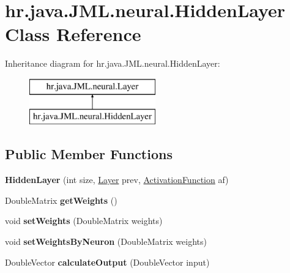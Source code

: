 \hypertarget{classhr_1_1java_1_1_j_m_l_1_1neural_1_1_hidden_layer}{\section{hr.\+java.\+J\+M\+L.\+neural.\+Hidden\+Layer Class Reference}
\label{classhr_1_1java_1_1_j_m_l_1_1neural_1_1_hidden_layer}
}
Inheritance diagram for hr.\+java.\+J\+M\+L.\+neural.\+Hidden\+Layer\+:\begin{figure}[H]
\begin{center}
\leavevmode
\includegraphics[height=2.000000cm]{classhr_1_1java_1_1_j_m_l_1_1neural_1_1_hidden_layer}
\end{center}
\end{figure}
\subsection*{Public Member Functions}
\begin{DoxyCompactItemize}
\item 
\hypertarget{classhr_1_1java_1_1_j_m_l_1_1neural_1_1_hidden_layer_a06bec6318a3df6d8875456a929b6c7be}{{\bfseries Hidden\+Layer} (int size, \hyperlink{classhr_1_1java_1_1_j_m_l_1_1neural_1_1_layer}{Layer} prev, \hyperlink{classhr_1_1java_1_1_j_m_l_1_1activation_functions_1_1_activation_function}{Activation\+Function} af)}\label{classhr_1_1java_1_1_j_m_l_1_1neural_1_1_hidden_layer_a06bec6318a3df6d8875456a929b6c7be}

\item 
\hypertarget{classhr_1_1java_1_1_j_m_l_1_1neural_1_1_hidden_layer_a7733681e771539a9b823ff1dab7a1268}{Double\+Matrix {\bfseries get\+Weights} ()}\label{classhr_1_1java_1_1_j_m_l_1_1neural_1_1_hidden_layer_a7733681e771539a9b823ff1dab7a1268}

\item 
\hypertarget{classhr_1_1java_1_1_j_m_l_1_1neural_1_1_hidden_layer_ad22a3dce74605c99932e97e3aa3d6bc2}{void {\bfseries set\+Weights} (Double\+Matrix weights)}\label{classhr_1_1java_1_1_j_m_l_1_1neural_1_1_hidden_layer_ad22a3dce74605c99932e97e3aa3d6bc2}

\item 
\hypertarget{classhr_1_1java_1_1_j_m_l_1_1neural_1_1_hidden_layer_ab1570066733f3a2f10a91e254868b1f2}{void {\bfseries set\+Weights\+By\+Neuron} (Double\+Matrix weights)}\label{classhr_1_1java_1_1_j_m_l_1_1neural_1_1_hidden_layer_ab1570066733f3a2f10a91e254868b1f2}

\item 
\hypertarget{classhr_1_1java_1_1_j_m_l_1_1neural_1_1_hidden_layer_a80075b02ea927fa1904c47e5e24e1b56}{Double\+Vector {\bfseries calculate\+Output} (Double\+Vector input)}\label{classhr_1_1java_1_1_j_m_l_1_1neural_1_1_hidden_layer_a80075b02ea927fa1904c47e5e24e1b56}

\end{DoxyCompactItemize}
